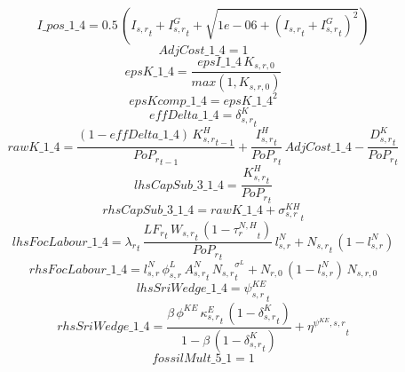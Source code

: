\begin{dmath*}
I\_pos\_1\_4 = 0.5\, \left({{I_{s,r}}}_{t}+{{I^G_{s,r}}}_{t}+\sqrt{1e-06+\left({{I_{s,r}}}_{t}+{{I^G_{s,r}}}_{t}\right)^{2}}\right)
\end{dmath*}
\begin{dmath*}
AdjCost\_1\_4 = 1
\end{dmath*}
\begin{dmath*}
epsK\_1\_4 = \frac{{epsI\_1\_4}\, {{K_{s,r,0}}}}{max(1,{{K_{s,r,0}}})}
\end{dmath*}
\begin{dmath*}
epsKcomp\_1\_4 = {epsK\_1\_4}^{2}
\end{dmath*}
\begin{dmath*}
effDelta\_1\_4 = {{\delta^{K}_{s,r}}}_{t}
\end{dmath*}
\begin{dmath*}
rawK\_1\_4 = \frac{\left(1-{effDelta\_1\_4}\right)\, {{K^H_{s,r}}}_{t-1}}{{{PoP_r}}_{t-1}}+\frac{{{I^H_{s,r}}}_{t}}{{{PoP_r}}_{t}}\, {AdjCost\_1\_4}-\frac{{{D^K_{s,r}}}_{t}}{{{PoP_r}}_{t}}
\end{dmath*}
\begin{dmath*}
lhsCapSub\_3\_1\_4 = \frac{{{K^H_{s,r}}}_{t}}{{{PoP_r}}_{t}}
\end{dmath*}
\begin{dmath*}
rhsCapSub\_3\_1\_4 = {rawK\_1\_4}+{{\sigma^{KH}_{s,r}}}_{t}
\end{dmath*}
\begin{dmath*}
lhsFocLabour\_1\_4 = {\lambda_r}_{t}\, \frac{{{LF_r}}_{t}\, {{W_{s,r}}}_{t}\, \left(1-{{\tau^{N,H}_{r}}}_{t}\right)}{{{PoP_r}}_{t}}\, {{l^{N}_{s,r}}}+{{N_{s,r}}}_{t}\, \left(1-{{l^{N}_{s,r}}}\right)
\end{dmath*}
\begin{dmath*}
rhsFocLabour\_1\_4 = {{l^{N}_{s,r}}}\, {{\phi^{L}_{s,r}}}\, {{A^{N}_{s,r}}}_{t}\, {{N_{s,r}}}_{t}^{{{\sigma^{L}}}}+{{N_{r,0}}}\, \left(1-{{l^{N}_{s,r}}}\right)\, {{N_{s,r,0}}}
\end{dmath*}
\begin{dmath*}
lhsSriWedge\_1\_4 = {{\psi^{KE}_{s,r}}}_{t}
\end{dmath*}
\begin{dmath*}
rhsSriWedge\_1\_4 = \frac{{{\beta}}\, {{\phi^{KE}}}\, {{\kappa^{E}_{s,r}}}_{t}\, \left(1-{{\delta^{K}_{s,r}}}_{t}\right)}{1-{{\beta}}\, \left(1-{{\delta^{K}_{s,r}}}_{t}\right)}+{{\eta^{\psi^{KE},s,r}}}_{t}
\end{dmath*}
\begin{dmath*}
fossilMult\_5\_1 = 1
\end{dmath*}
